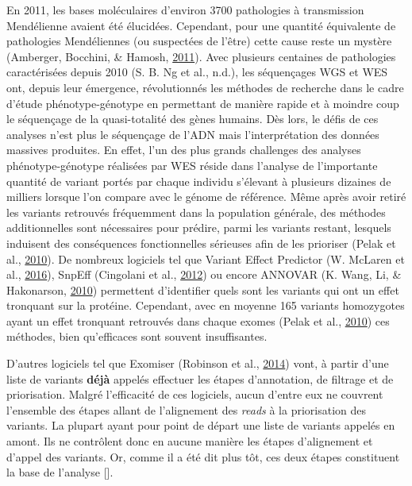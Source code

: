 \documentclass[12pt,twoside]{reedthesis}
\theoremstyle{definition}
\theoremstyle{definition}
\theoremstyle{remark}
\begin{document}
  En 2011, les bases moléculaires d'environ 3700 pathologies à
  transmission Mendélienne avaient été élucidées. Cependant, pour une
  quantité équivalente de pathologies Mendéliennes (ou suspectées de
  l'être) cette cause reste un mystère (Amberger, Bocchini, \& Hamosh,
  \protect\hyperlink{ref-Amberger2011}{2011}). Avec plusieurs centaines de
  pathologies caractérisées depuis 2010 (S. B. Ng et al., n.d.), les
  séquençages WGS et WES ont, depuis leur émergence, révolutionnés les
  méthodes de recherche dans le cadre d'étude phénotype-génotype en
  permettant de manière rapide et à moindre coup le séquençage de la
  quasi-totalité des gènes humains. Dès lors, le défis de ces analyses
  n'est plus le séquençage de l'ADN mais l'interprétation des données
  massives produites. En effet, l'un des plus grands challenges des
  analyses phénotype-génotype réalisées par WES réside dans l'analyse de
  l'importante quantité de variant portés par chaque individu s'élevant à
  plusieurs dizaines de milliers lorsque l'on compare avec le génome de
  référence. Même après avoir retiré les variants retrouvés fréquemment
  dans la population générale, des méthodes additionnelles sont
  nécessaires pour prédire, parmi les variants restant, lesquels induisent
  des conséquences fonctionnelles sérieuses afin de les prioriser (Pelak
  et al., \protect\hyperlink{ref-Pelak2010}{2010}). De nombreux logiciels
  tel que Variant Effect Predictor (W. McLaren et al.,
  \protect\hyperlink{ref-McLaren2016}{2016}), SnpEff (Cingolani et al.,
  \protect\hyperlink{ref-Cingolani2012}{2012}) ou encore ANNOVAR (K. Wang,
  Li, \& Hakonarson, \protect\hyperlink{ref-Wang2010}{2010}) permettent
  d'identifier quels sont les variants qui ont un effet tronquant sur la
  protéine. Cependant, avec en moyenne 165 variants homozygotes ayant un
  effet tronquant retrouvés dans chaque exomes (Pelak et al.,
  \protect\hyperlink{ref-Pelak2010}{2010}) ces méthodes, bien qu'efficaces
  sont souvent insuffisantes.
  
  D'autres logiciels tel que Exomiser (Robinson et al.,
  \protect\hyperlink{ref-Robinson2014}{2014}) vont, à partir d'une liste
  de variants \textbf{déjà} appelés effectuer les étapes d'annotation, de
  filtrage et de priorisation. Malgré l'efficacité de ces logiciels, aucun
  d'entre eux ne couvrent l'ensemble des étapes allant de l'alignement des
  \emph{reads} à la priorisation des variants. La plupart ayant pour point
  de départ une liste de variants appelés en amont. Ils ne contrôlent donc
  en aucune manière les étapes d'alignement et d'appel des variants. Or,
  comme il a été dit plus tôt, ces deux étapes constituent la base de
  l'analyse {[}{]}.
  
\end{document}
